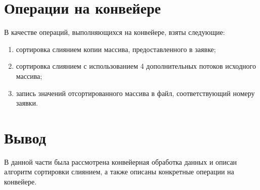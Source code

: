 \section{Операции на конвейере}
В качестве операций, выполняющихся на конвейере, взяты следующие:
\begin{enumerate}
	\item сортировка слиянием копии массива, предоставленного в заявке;
	\item сортировка слиянием с использованием 4 дополнительных потоков исходного массива;
	\item запись значений отсортированного массива в файл, соответствующий номеру заявки.
\end{enumerate}


\section*{Вывод}
В данной части была рассмотрена конвейерная обработка данных и описан алгоритм сортировки слиянием, а также описаны конкретные операции на конвейере.
